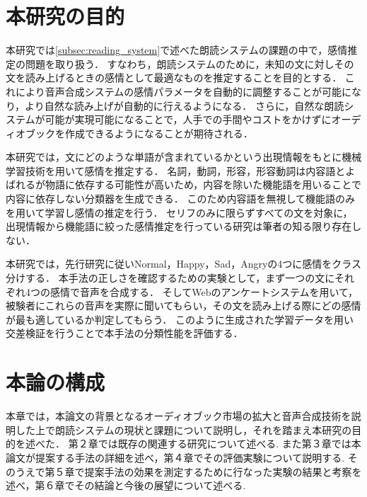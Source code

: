 \section{本研究の目的}
本研究では\ref{subsec:reading_system}で述べた朗読システムの課題の中で，感情推定の問題を取り扱う．
すなわち，朗読システムのために，未知の文に対しその文を読み上げるときの感情として最適なものを推定することを目的とする．
これにより音声合成システムの感情パラメータを自動的に調整することが可能になり，より自然な読み上げが自動的に行えるようになる．
さらに，自然な朗読システムが可能が実現可能になることで，人手での手間やコストをかけずにオーディオブックを作成できるようになることが期待される．


本研究では，文にどのような単語が含まれているかという出現情報をもとに機械学習技術を用いて感情を推定する．
名詞，動詞，形容，形容動詞は内容語とよばれるが物語に依存する可能性が高いため，内容を除いた機能語を用いることで内容に依存しない分類器を生成できる．
このため内容語を無視して機能語のみを用いて学習し感情の推定を行う．
セリフのみに限らずすべての文を対象に，出現情報から機能語に絞った感情推定を行っている研究は筆者の知る限り存在しない．


本研究では，先行研究に従いNormal，Happy，Sad，Angryの4つに感情をクラス分けする．
本手法の正しさを確認するための実験として，まず一つの文にそれぞれ4つの感情で音声を合成する．
そしてWebのアンケートシステムを用いて，被験者にこれらの音声を実際に聞いてもらい，その文を読み上げる際にどの感情が最も適しているか判定してもらう．
このように生成された学習データを用い交差検証を行うことで本手法の分類性能を評価する．


\section{本論の構成}
本章では，本論文の背景となるオーディオブック市場の拡大と音声合成技術を説明した上で朗読システムの現状と課題について説明し，それを踏まえ本研究の目的を述べた．
第２章では既存の関連する研究について述べる.
また第３章では本論文が提案する手法の詳細を述べ，第４章でその評価実験について説明する.
そのうえで第５章で提案手法の効果を測定するために行なった実験の結果と考察を述べ，第６章でその結論と今後の展望について述べる.

